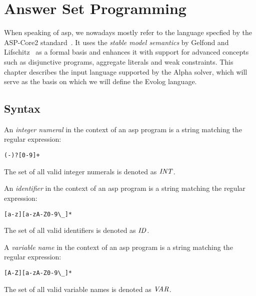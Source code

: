 \section{Answer Set Programming}

When speaking of \gls{asp}, we nowadays mostly refer to the language specfied by the ASP-Core2 standard~\cite{asp-core2}. It uses the \emph{stable model semantics} by Gelfond and Lifschitz~\cite{stable-models} as a formal basis and enhances it with support for advanced concepts such as disjunctive programs, aggregate literals and weak constraints. This chapter describes the input language supported by the Alpha solver, which will serve as the basis on which we will define the Evolog language.

\subsection{Syntax}
\label{subsec:prelims-asp-syntax}

\begin{definition}
\label{def:prelims-asp-syntax-int}
An \emph{integer numeral} in the context of an \gls{asp} program is a string matching the regular expression:
\begin{lstlisting}[style=code]
(-)?[0-9]+
\end{lstlisting}
The set of all valid integer numerals is denoted as $\mathit{INT}$.
\end{definition}

\begin{definition}[Identifier]
\label{def:prelims-asp-syntax-id}
An \emph{identifier} in the context of an \gls{asp} program is a string matching the regular expression:
\begin{lstlisting}[style=code]
[a-z][a-zA-Z0-9\_]*
\end{lstlisting}
The set of all valid identifiers is denoted as $\mathit{ID}$.
\end{definition}

\begin{definition}
\label{def:prelims-asp-syntax-var}
A \emph{variable name} in the context of an \gls{asp} program is a string matching the regular expression:
\begin{lstlisting}[style=code]
[A-Z][a-zA-Z0-9\_]*
\end{lstlisting}
The set of all valid variable names is denoted as $\mathit{VAR}$.
\end{definition}

